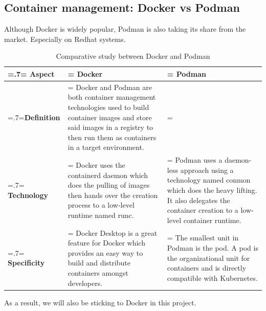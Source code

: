 \subsection{Container management: Docker vs Podman}
Although Docker is widely popular, Podman is also taking its share from the market. Especially on Redhat systems.
\begin{table}[H]
    \renewcommand{\arraystretch}{1.5}%
    \caption{Comparative study between Docker and Podman}
    \centering
    \medskip
    \begin{tabularx}{1\textwidth} {
            | >{\hsize=.7\hsize\linewidth=\hsize\centering\arraybackslash}X
            | >{\hsize=1.15\hsize\linewidth=\hsize\justifying\arraybackslash}X
            | >{\hsize=1.15\hsize\linewidth=\hsize\justifying\arraybackslash}X |}
        \hline
        \rowcolor{primary} \textbf {Aspect} & \textbf {Docker}                                                                                                                                                                                                                    & \textbf {Podman}                                                                                                                                                                      \\
        \hline
        \textbf {Definition}                & \multicolumn{2}{|>{\hsize=2.35\hsize}X|} {Docker and Podman are both  container management technologies used to build container images and store said images in a registry to then run them as containers in a target environment.}                                                                                                                                                                                         \\
        \hline
        \textbf {Technology}                & \noindent Docker uses the containerd daemon which does the pulling of images then hands over the creation process to a low-level runtime named runc.                                                                                & \noindent Podman uses a daemon-less approach using a technology named conmon which does the heavy lifting. It also delegates the container creation to a low-level container runtime. \\
        \hline
        \textbf {Specificity}               & \noindent Docker Desktop is a great feature for Docker which provides an easy way to build and distribute containers amongst developers.                                                                                            & \noindent The smallest unit in Podman is the pod. A pod is the organizational unit for containers and is directly compatible with Kubernetes.                                         \\
        \hline
    \end{tabularx}
\end{table}
As a result, we will also be sticking to Docker in this project.

